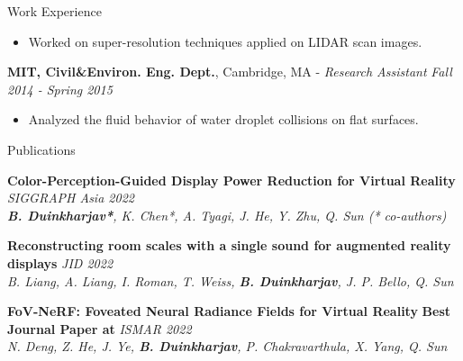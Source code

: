 \documentclass{resume}
\begin{document}
\begin{area}{Work Experience}
        \begin{itemize}
            \item Worked on super-resolution techniques applied on LIDAR scan images.
        \end{itemize}
    \item
        \textbf{MIT, Civil\&Environ. Eng. Dept.}, Cambridge, MA - \emph{Research Assistant} \hfill \emph{Fall 2014 - Spring 2015}
        \begin{itemize}
            \item Analyzed the fluid behavior of water droplet collisions on flat surfaces.
        \end{itemize}
\end{area}

\begin{area}{Publications}
    \item
        \textbf{Color-Perception-Guided Display Power Reduction for Virtual Reality}
        \hfill
        \emph{SIGGRAPH Asia 2022}
        \\%
        \hspace*{2mm}
        \emph{\textbf{B. Duinkharjav*}, K. Chen*, A. Tyagi, J. He, Y. Zhu, Q. Sun (* co-authors)}
    \item
        \textbf{Reconstructing room scales with a single sound for augmented reality displays}
        \hfill
        \emph{JID 2022}
        \\%
        \hspace*{2mm}
        \emph{B. Liang, A. Liang, I. Roman, T. Weiss, \textbf{B. Duinkharjav}, J. P. Bello, Q. Sun}
    \item
        \textbf{FoV-NeRF: Foveated Neural Radiance Fields for Virtual Reality}
        \hfill
        \textbf{Best Journal Paper at}
        \emph{ISMAR 2022}
        \\%
        \hspace*{2mm}
        \emph{N. Deng, Z. He, J. Ye, \textbf{B. Duinkharjav}, P. Chakravarthula, X. Yang, Q. Sun}
    \item

\end{area}
\end{document}
